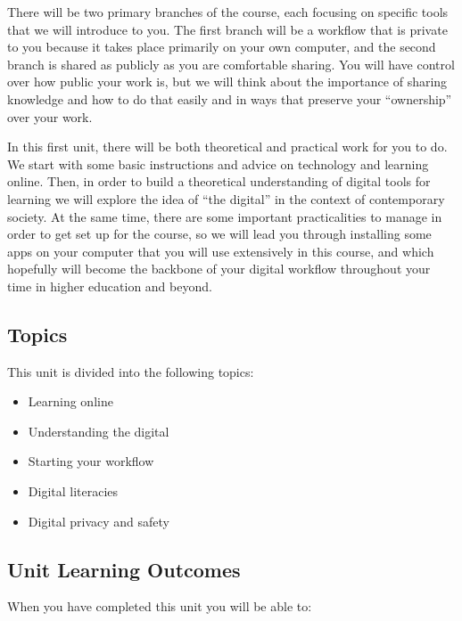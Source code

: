 \documentclass[
  letterpaper,
  DIV=11,
  numbers=noendperiod]{scrreprt}
\providecommand{\tightlist}{%
  \setlength{\itemsep}{0pt}\setlength{\parskip}{0pt}}\usepackage{longtable,booktabs,array}
\begin{document}
There will be two primary branches of the course, each focusing on
specific tools that we will introduce to you. The first branch will be a
workflow that is private to you because it takes place primarily on your
own computer, and the second branch is shared as publicly as you are
comfortable sharing. You will have control over how public your work is,
but we will think about the importance of sharing knowledge and how to
do that easily and in ways that preserve your ``ownership'' over your
work.

In this first unit, there will be both theoretical and practical work
for you to do. We start with some basic instructions and advice on
technology and learning online. Then, in order to build a theoretical
understanding of digital tools for learning we will explore the idea of
``the digital'' in the context of contemporary society. At the same
time, there are some important practicalities to manage in order to get
set up for the course, so we will lead you through installing some apps
on your computer that you will use extensively in this course, and which
hopefully will become the backbone of your digital workflow throughout
your time in higher education and beyond.

\subsection*{Topics}\label{topics}

This unit is divided into the following topics:

\begin{itemize}
\tightlist
\item
  Learning online
\item
  Understanding the digital
\item
  Starting your workflow
\item
  Digital literacies
\item
  Digital privacy and safety
\end{itemize}

\subsection*{Unit Learning Outcomes}\label{unit-learning-outcomes}

When you have completed this unit you will be able to:
\end{document}
